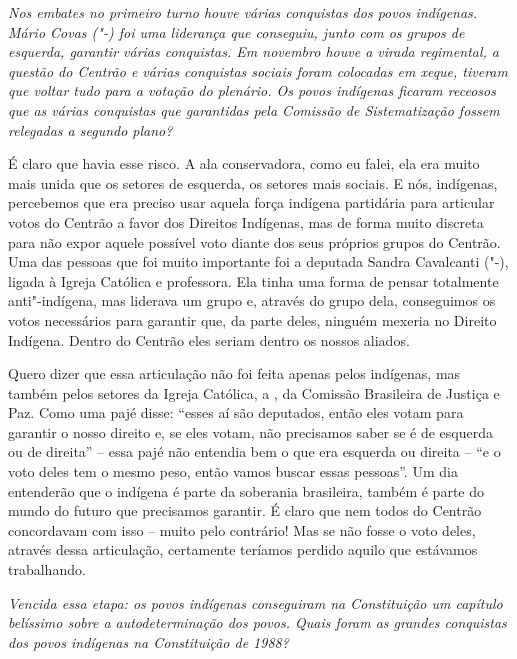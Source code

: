\medskip

\noindent\emph{Nos embates no primeiro turno houve várias conquistas dos povos
indígenas. Mário Covas ("-) foi uma liderança que conseguiu, junto
com os grupos de esquerda, garantir várias conquistas. Em novembro houve
a virada regimental, a questão do Centrão e várias conquistas sociais
foram colocadas em xeque, tiveram que voltar tudo para a votação do
plenário. Os povos indígenas ficaram receosos que as várias conquistas
que garantidas pela Comissão de Sistematização fossem relegadas a
segundo plano?}

É claro que havia esse risco. A ala conservadora, como
eu falei, ela era muito mais unida que os setores de esquerda, os
setores mais sociais. E nós, indígenas, percebemos que era preciso usar
aquela força indígena partidária para articular votos do Centrão a favor
dos Direitos Indígenas, mas de forma muito discreta para não expor
aquele possível voto diante dos seus próprios grupos do Centrão. Uma das
pessoas que foi muito importante foi a deputada Sandra Cavalcanti
("-), ligada à Igreja Católica e professora. Ela tinha uma forma de
pensar totalmente anti"-indígena, mas liderava um grupo e, através do
grupo dela, conseguimos os votos necessários para garantir que, da parte
deles, ninguém mexeria no Direito Indígena. Dentro do Centrão eles
seriam dentro os nossos aliados.

Quero dizer que essa articulação não foi feita apenas pelos indígenas,
mas também pelos setores da Igreja Católica, a , da Comissão
Brasileira de Justiça e Paz. Como uma pajé disse: ``esses aí são
deputados, então eles votam para garantir o nosso direito e, se eles
votam, não precisamos saber se é de esquerda ou de direita'' -- essa
pajé não entendia bem o que era esquerda ou direita -- ``e o voto deles
tem o mesmo peso, então vamos buscar essas pessoas''. Um dia entenderão
que o indígena é parte da soberania brasileira, também é parte do mundo
do futuro que precisamos garantir. É claro que nem todos do Centrão
concordavam com isso -- muito pelo contrário! Mas se não fosse o voto
deles, através dessa articulação, certamente teríamos perdido aquilo que
estávamos trabalhando.

\medskip

\noindent\emph{Vencida essa etapa: os povos indígenas conseguiram na
Constituição um capítulo belíssimo sobre a autodeterminação dos povos.
Quais foram as grandes conquistas dos povos indígenas na Constituição de
1988?}

